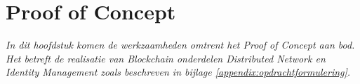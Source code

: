 \chapter{Proof of Concept}

\textit{In dit hoofdstuk komen de werkzaamheden omtrent het Proof of Concept aan bod. Het betreft de realisatie van Blockchain onderdelen Distributed Network en Identity Management zoals beschreven in bijlage \ref{appendix:opdrachtformulering}.}


